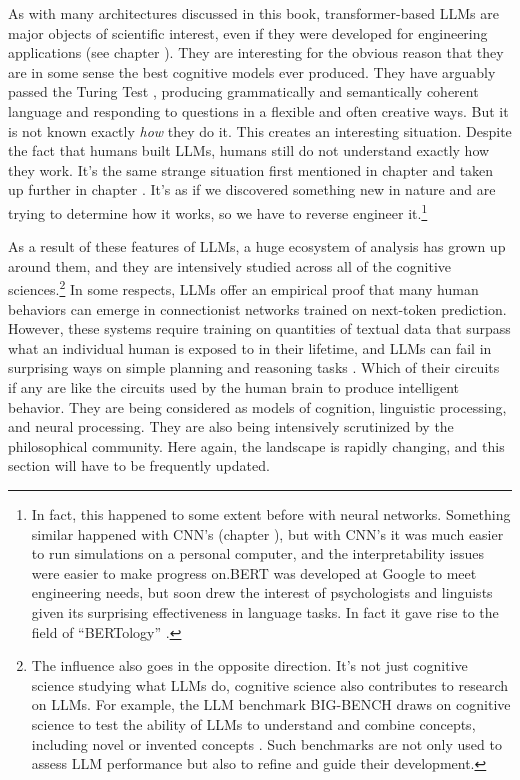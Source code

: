 As with many architectures discussed in this book, transformer-based LLMs are major objects of scientific interest, even if they were developed for engineering applications (see chapter ). They are interesting for the obvious reason that they are in some sense the best cognitive models ever produced. They have arguably passed the Turing Test \cite{jones2024does}, producing grammatically and semantically coherent language and responding to questions in a flexible and often creative ways. But it is not known exactly \emph{how} they do it. This creates an interesting situation. Despite the fact that humans built LLMs, humans still do not understand exactly how they work. It's the same strange situation first mentioned in chapter  and taken up further in chapter . It's as if we discovered something new in nature and are trying to determine how it works, so we have to  reverse engineer it.\footnote{In fact, this happened  to some extent before with neural networks. Something similar happened with CNN's (chapter ), but with CNN's it was much easier to  run simulations on a personal computer, and the interpretability issues were easier to make progress on.BERT was developed at Google to meet engineering needs, but soon drew the interest of psychologists and linguists given its surprising effectiveness in language tasks. In fact it gave rise to the field of  ``BERTology'' \cite{rogers2020primer}.}

As a result of these features of LLMs, a huge ecosystem of analysis has grown up around them, and they are intensively studied across all of the cognitive sciences.\footnote{The influence also goes in the opposite direction. It's not just cognitive science studying what LLMs do, cognitive science also contributes to research on LLMs. For example, the LLM benchmark BIG-BENCH draws on cognitive science to test the ability of LLMs to understand and combine concepts, including novel or invented concepts \cite{srivastava2022beyond}. Such benchmarks are not only used to assess LLM performance but also to refine and guide their development.} In some respects, LLMs offer an empirical proof that many human behaviors can emerge in connectionist networks trained on next-token prediction. However, these systems require training on quantities of textual data that surpass what an individual human is exposed to in their lifetime, and LLMs can fail in surprising ways on simple planning and reasoning tasks \cite{momennejad2023cogeval}. Which of their circuits if any are like the circuits used by the human brain to produce intelligent behavior. They are being considered as models of cognition, linguistic processing, and neural processing. They are also being intensively scrutinized by the philosophical community. Here again, the landscape is rapidly changing, and this section will have to be frequently updated.


